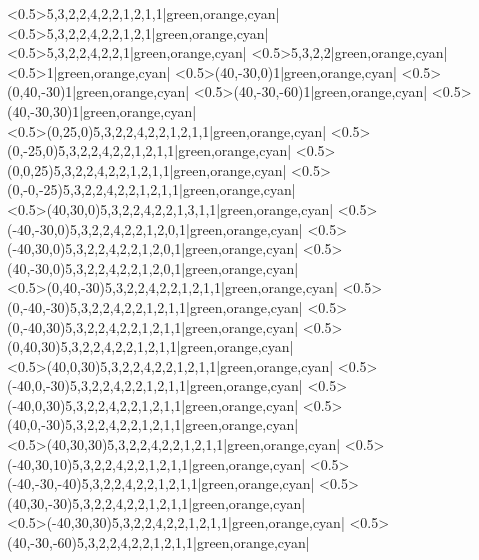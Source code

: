 

\blockstructure<0.5>{{5,3,2,2},{4,2,2,1},{2,1},{1}}|green,orange,cyan|
\blockstructure<0.5>{{5,3,2,2},{4,2,2,1},{2,1}}|green,orange,cyan|
\blockstructure<0.5>{{5,3,2,2},{4,2,2,1}}|green,orange,cyan|
\blockstructure<0.5>{{5,3,2,2}}|green,orange,cyan|
\\
\blockstructure<0.5>{{1}}|green,orange,cyan|
\blockstructure<0.5>(40,-30,0){{1}}|green,orange,cyan|
\blockstructure<0.5>(0,40,-30){{1}}|green,orange,cyan|
\blockstructure<0.5>(40,-30,-60){{1}}|green,orange,cyan|
\blockstructure<0.5>(40,-30,30){{1}}|green,orange,cyan|
\\
\blockstructure<0.5>(0,25,0){{5,3,2,2},{4,2,2,1},{2,1},{1}}|green,orange,cyan|
\blockstructure<0.5>(0,-25,0){{5,3,2,2},{4,2,2,1},{2,1},{1}}|green,orange,cyan|
\blockstructure<0.5>(0,0,25){{5,3,2,2},{4,2,2,1},{2,1},{1}}|green,orange,cyan|
\blockstructure<0.5>(0,-0,-25){{5,3,2,2},{4,2,2,1},{2,1},{1}}|green,orange,cyan|
\\
\blockstructure<0.5>(40,30,0){{5,3,2,2},{4,2,2,1},{3,1},{1}}|green,orange,cyan|
\blockstructure<0.5>(-40,-30,0){{5,3,2,2},{4,2,2,1},{2,0},{1}}|green,orange,cyan|
\blockstructure<0.5>(-40,30,0){{5,3,2,2},{4,2,2,1},{2,0},{1}}|green,orange,cyan|
\blockstructure<0.5>(40,-30,0){{5,3,2,2},{4,2,2,1},{2,0},{1}}|green,orange,cyan|%
\\
\blockstructure<0.5>(0,40,-30){{5,3,2,2},{4,2,2,1},{2,1},{1}}|green,orange,cyan|%
\blockstructure<0.5>(0,-40,-30){{5,3,2,2},{4,2,2,1},{2,1},{1}}|green,orange,cyan|
\blockstructure<0.5>(0,-40,30){{5,3,2,2},{4,2,2,1},{2,1},{1}}|green,orange,cyan|
\blockstructure<0.5>(0,40,30){{5,3,2,2},{4,2,2,1},{2,1},{1}}|green,orange,cyan|
\\
\blockstructure<0.5>(40,0,30){{5,3,2,2},{4,2,2,1},{2,1},{1}}|green,orange,cyan|
\blockstructure<0.5>(-40,0,-30){{5,3,2,2},{4,2,2,1},{2,1},{1}}|green,orange,cyan|
\blockstructure<0.5>(-40,0,30){{5,3,2,2},{4,2,2,1},{2,1},{1}}|green,orange,cyan|%
\blockstructure<0.5>(40,0,-30){{5,3,2,2},{4,2,2,1},{2,1},{1}}|green,orange,cyan|
\\
\blockstructure<0.5>(40,30,30){{5,3,2,2},{4,2,2,1},{2,1},{1}}|green,orange,cyan|
\blockstructure<0.5>(-40,30,10){{5,3,2,2},{4,2,2,1},{2,1},{1}}|green,orange,cyan|
\blockstructure<0.5>(-40,-30,-40){{5,3,2,2},{4,2,2,1},{2,1},{1}}|green,orange,cyan|
\blockstructure<0.5>(40,30,-30){{5,3,2,2},{4,2,2,1},{2,1},{1}}|green,orange,cyan|
\\
\blockstructure<0.5>(-40,30,30){{5,3,2,2},{4,2,2,1},{2,1},{1}}|green,orange,cyan|
\blockstructure<0.5>(40,-30,-60){{5,3,2,2},{4,2,2,1},{2,1},{1}}|green,orange,cyan|%
